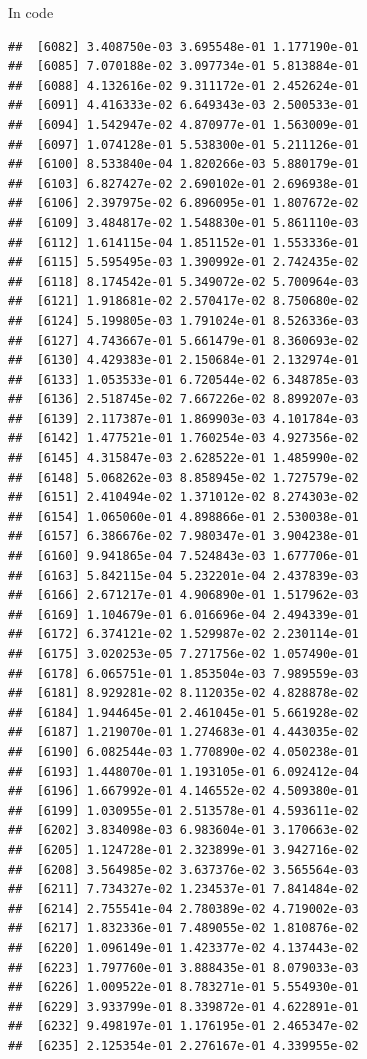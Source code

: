 \documentclass[ignorenonframetext,]{beamer}
\begin{document}
\begin{frame}[fragile]{In code}
\begin{verbatim}
##  [6082] 3.408750e-03 3.695548e-01 1.177190e-01
##  [6085] 7.070188e-02 3.097734e-01 5.813884e-01
##  [6088] 4.132616e-02 9.311172e-01 2.452624e-01
##  [6091] 4.416333e-02 6.649343e-03 2.500533e-01
##  [6094] 1.542947e-02 4.870977e-01 1.563009e-01
##  [6097] 1.074128e-01 5.538300e-01 5.211126e-01
##  [6100] 8.533840e-04 1.820266e-03 5.880179e-01
##  [6103] 6.827427e-02 2.690102e-01 2.696938e-01
##  [6106] 2.397975e-02 6.896095e-01 1.807672e-02
##  [6109] 3.484817e-02 1.548830e-01 5.861110e-03
##  [6112] 1.614115e-04 1.851152e-01 1.553336e-01
##  [6115] 5.595495e-03 1.390992e-01 2.742435e-02
##  [6118] 8.174542e-01 5.349072e-02 5.700964e-03
##  [6121] 1.918681e-02 2.570417e-02 8.750680e-02
##  [6124] 5.199805e-03 1.791024e-01 8.526336e-03
##  [6127] 4.743667e-01 5.661479e-01 8.360693e-02
##  [6130] 4.429383e-01 2.150684e-01 2.132974e-01
##  [6133] 1.053533e-01 6.720544e-02 6.348785e-03
##  [6136] 2.518745e-02 7.667226e-02 8.899207e-03
##  [6139] 2.117387e-01 1.869903e-03 4.101784e-03
##  [6142] 1.477521e-01 1.760254e-03 4.927356e-02
##  [6145] 4.315847e-03 2.628522e-01 1.485990e-02
##  [6148] 5.068262e-03 8.858945e-02 1.727579e-02
##  [6151] 2.410494e-02 1.371012e-02 8.274303e-02
##  [6154] 1.065060e-01 4.898866e-01 2.530038e-01
##  [6157] 6.386676e-02 7.980347e-01 3.904238e-01
##  [6160] 9.941865e-04 7.524843e-03 1.677706e-01
##  [6163] 5.842115e-04 5.232201e-04 2.437839e-03
##  [6166] 2.671217e-01 4.906890e-01 1.517962e-03
##  [6169] 1.104679e-01 6.016696e-04 2.494339e-01
##  [6172] 6.374121e-02 1.529987e-02 2.230114e-01
##  [6175] 3.020253e-05 7.271756e-02 1.057490e-01
##  [6178] 6.065751e-01 1.853504e-03 7.989559e-03
##  [6181] 8.929281e-02 8.112035e-02 4.828878e-02
##  [6184] 1.944645e-01 2.461045e-01 5.661928e-02
##  [6187] 1.219070e-01 1.274683e-01 4.443035e-02
##  [6190] 6.082544e-03 1.770890e-02 4.050238e-01
##  [6193] 1.448070e-01 1.193105e-01 6.092412e-04
##  [6196] 1.667992e-01 4.146552e-02 4.509380e-01
##  [6199] 1.030955e-01 2.513578e-01 4.593611e-02
##  [6202] 3.834098e-03 6.983604e-01 3.170663e-02
##  [6205] 1.124728e-01 2.323899e-01 3.942716e-02
##  [6208] 3.564985e-02 3.637376e-02 3.565564e-03
##  [6211] 7.734327e-02 1.234537e-01 7.841484e-02
##  [6214] 2.755541e-04 2.780389e-02 4.719002e-03
##  [6217] 1.832336e-01 7.489055e-02 1.810876e-02
##  [6220] 1.096149e-01 1.423377e-02 4.137443e-02
##  [6223] 1.797760e-01 3.888435e-01 8.079033e-03
##  [6226] 1.009522e-01 8.783271e-01 5.554930e-01
##  [6229] 3.933799e-01 8.339872e-01 4.622891e-01
##  [6232] 9.498197e-01 1.176195e-01 2.465347e-02
##  [6235] 2.125354e-01 2.276167e-01 4.339955e-02

\end{verbatim}
\end{frame}
\end{document}
